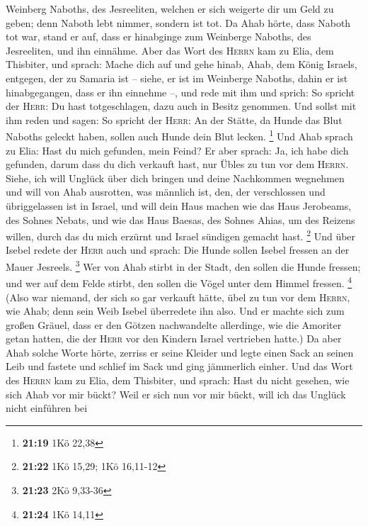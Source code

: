 Weinberg Naboths, des Jesreeliten, welchen er sich weigerte dir um Geld
zu geben; denn Naboth lebt nimmer, sondern ist tot.  Da
Ahab hörte, dass Naboth tot war, stand er auf, dass er hinabginge zum
Weinberge Naboths, des Jesreeliten, und ihn einnähme. 
Aber das Wort des \textsc{Herrn} kam zu Elia, dem Thisbiter, und sprach:
 Mache dich auf und gehe hinab, Ahab, dem König Israels,
entgegen, der zu Samaria ist -- siehe, er ist im Weinberge Naboths,
dahin er ist hinabgegangen, dass er ihn einnehme --,  und
rede mit ihm und sprich: So spricht der \textsc{Herr}: Du hast
totgeschlagen, dazu auch in Besitz genommen. Und sollst mit ihm reden
und sagen: So spricht der \textsc{Herr}: An der Stätte, da Hunde das
Blut Naboths geleckt haben, sollen auch Hunde dein Blut lecken.
\footnote{\textbf{21:19} 1Kö 22,38}  Und Ahab sprach zu
Elia: Hast du mich gefunden, mein Feind? Er aber sprach: Ja, ich habe
dich gefunden, darum dass du dich verkauft hast, nur Übles zu tun vor
dem \textsc{Herrn}.  Siehe, ich will Unglück über dich
bringen und deine Nachkommen wegnehmen und will von Ahab ausrotten, was
männlich ist, den, der verschlossen und übriggelassen ist in Israel,
 und will dein Haus machen wie das Haus Jerobeams, des
Sohnes Nebats, und wie das Haus Baesas, des Sohnes Ahias, um des Reizens
willen, durch das du mich erzürnt und Israel sündigen gemacht hast.
\footnote{\textbf{21:22} 1Kö 15,29; 1Kö 16,11-12}  Und
über Isebel redete der \textsc{Herr} auch und sprach: Die Hunde sollen
Isebel fressen an der Mauer Jesreels. \footnote{\textbf{21:23} 2Kö
  9,33-36}  Wer von Ahab stirbt in der Stadt, den sollen
die Hunde fressen; und wer auf dem Felde stirbt, den sollen die Vögel
unter dem Himmel fressen. \footnote{\textbf{21:24} 1Kö 14,11}
 (Also war niemand, der sich so gar verkauft hätte, übel
zu tun vor dem \textsc{Herrn}, wie Ahab; denn sein Weib Isebel
überredete ihn also.  Und er machte sich zum großen
Gräuel, dass er den Götzen nachwandelte allerdinge, wie die Amoriter
getan hatten, die der \textsc{Herr} vor den Kindern Israel vertrieben
hatte.)  Da aber Ahab solche Worte hörte, zerriss er
seine Kleider und legte einen Sack an seinen Leib und fastete und
schlief im Sack und ging jämmerlich einher.  Und das Wort
des \textsc{Herrn} kam zu Elia, dem Thisbiter, und sprach:
 Hast du nicht gesehen, wie sich Ahab vor mir bückt? Weil
er sich nun vor mir bückt, will ich das Unglück nicht einführen bei
